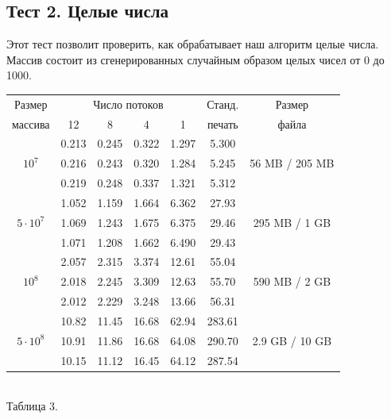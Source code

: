 \subsection{Тест 2. Целые числа}
Этот тест позволит проверить, как обрабатывает наш алгоритм целые числа. 
Массив состоит из сгенерированных случайным образом целых чисел от 0 до 1000.
\begin{center}
\begin{tabular}{||c|c|c|c|c|c|c||}
\hline
\hline
Размер & \multicolumn{4}{c|}{Число потоков} & Станд. & Размер\\
\hhline{~|-|-|-|-|~|~|}
массива & 12 & 8 & 4 & 1 & печать & файла\\
\hline
\hline
 & 0.213 & 0.245 & 0.322 & 1.297 & 5.300  &\\
\hhline{~|-|-|-|-|-|}
$10^7$ & 0.216 & 0.243 & 0.320 & 1.284 & 5.245  &56 MB / 205 MB \\
\hhline{~|-|-|-|-|-|}
 & 0.219 & 0.248 & 0.337 & 1.321 & 5.312  &\\
\hline
& 1.052 & 1.159 & 1.664 & 6.362 & 27.93  &\\
\hhline{~|-|-|-|-|-|}
$5 \cdot 10^7$& 1.069 & 1.243 & 1.675 & 6.375 & 29.46  &295 MB / 1 GB\\
\hhline{~|-|-|-|-|-|}
& 1.071  & 1.208 & 1.662 & 6.490 & 29.43  &\\
\hline
 & 2.057 & 2.315 & 3.374 & 12.61 & 55.04 & \\
\hhline{~|-|-|-|-|-|}
$10^8$ & 2.018 & 2.245 & 3.309 & 12.63 & 55.70  & 590 MB / 2 GB \\
\hhline{~|-|-|-|-|-|}
 & 2.012 & 2.229 & 3.248 & 13.66 & 56.31  &\\
\hline
 & 10.82 & 11.45 & 16.68 & 62.94 & 283.61  &\\
\hhline{~|-|-|-|-|-|}
$5 \cdot 10^8$ & 10.91 & 11.86 & 16.68 & 64.08 & 290.70  &2.9 GB / 10 GB\\
\hhline{~|-|-|-|-|-|}
 & 10.15 & 11.12 & 16.45 & 64.12 & 287.54  &\\
\hline
\hline
\end{tabular}
\\\vspace{10pt}
\small{Таблица 3.}
\end{center}

